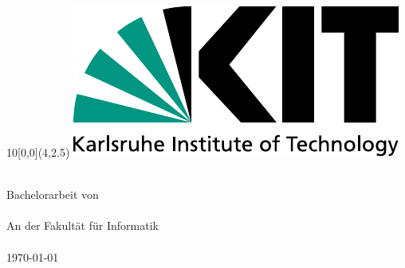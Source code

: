 
\newcommand{\diameter}{20}
\newcommand{\xone}{-15}
\newcommand{\xtwo}{160}
\newcommand{\yone}{15}
\newcommand{\ytwo}{-253}

\begin{titlepage}
	\begin{textblock}{10}[0,0](4,2.5)
		\includegraphics[width=.3\textwidth]{logos/KITLogo_RGB.pdf}
	\end{textblock}
	\vspace*{3.5cm}
	\begin{center}
		\Huge{\mytitle}
		\vspace*{2cm}\\
		\Large{
			Bachelorarbeit von
		}\\
		\vspace*{1cm}
		\huge{\myname}\\
		\vspace*{1cm}
		\Large{
			An der Fakult\"at f\"ur Informatik
			\\
			\myinstitute
		}\\
		\vspace*{1cm}
		\Large{\today}
	\end{center}
	\vspace*{1cm}



\end{titlepage}
